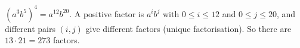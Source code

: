 $\left(a^3b^5\right)^4=a^{12}b^{20}$. A positive factor is $a^ib^j$ with $0\le i\le12$ and $0\le j\le20$, and different pairs $(i,j)$ give different factors (unique factorisation). So there are $13\cdot21=\boxed{273}$ factors.
